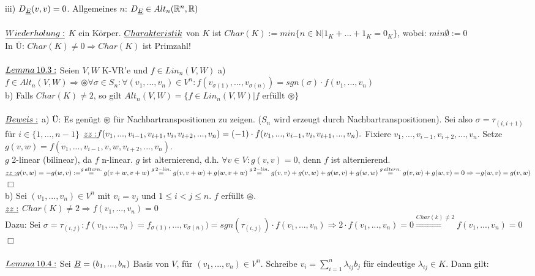\documentclass[fleqn, a4paper, 11pt]{article}
\begin{document}
iii) $D_{\uline{E}}(v,v)=0$. Allgemeines $n$: $D_{\uline{E}}\in Alt_n(\mathbb{R}^n,\mathbb{R})$\\
\\
$\uline{Wiederholung:}$ $K$ ein K\"orper. $\uline{Charakteristik}$ von $K$ ist $Char(K):=min\{n\in\mathbb{N} | 1_K+...+1_K=0_K\}$, wobei: $min\emptyset:=0$\\
In \"U: $Char(K)\neq 0\Rightarrow Char(K)$ ist Primzahl!\\
\\
$\uline{Lemma\:10.3:}$ Seien $V,W$ K-VR'e und $f\in Lin_n(V,W)$ a) $f\in Alt_n(V,W)\Rightarrow \circledast \forall\sigma\in S_n:\forall(v_1,...,v_n)\in V^n:f(v_{\sigma(1)},...,v_{\sigma(n)})=sgn(\sigma)\cdot f(v_1,...,v_n)$\\
b) Falls $Char(K)\neq 2$, so gilt $Alt_n(V,W)=\{f\in Lin_n(V,W) | f\text{ erf\"ullt }\circledast\}$\\
\\
$\uline{Beweis:}$ a) \"U: Es gen\"ugt $\circledast$ f\"ur Nachbartranspositionen zu zeigen. ($S_n$ wird erzeugt durch Nachbartranspositionen). Sei also $\sigma=\tau_{(i,i+1)}$ f\"ur $i\in\{1,...,n-1\}$ $\uline{zz:}f(v_1,...,v_{i-1},v_{i+1},v_i,v_{i+2},...,v_n)=(-1)\cdot f(v_1,...,v_{i-1},v_i,v_{i+1},...,v_n).$ Fixiere $v_1,...,v_{i-1},v_{i+2},...,v_n$. Setze $g(v,w)=f(v_1,...,v_{i-1},v,w,v_{i+2},...,v_n)$.\\
$g$ 2-linear (bilinear), da $f$ n-linear. $g$ ist alternierend, d.h. $\forall v\in V:g(v,v)=0$, denn $f$ ist alternierend.\\
$\uline{zz:}g(v,w)=-g(w,v):=\stackrel{g\:altern.}{=}g(v+w,v+w)\stackrel{g\:2-lin.}{=}g(v,v+w)+g(w,v+w)\stackrel{g\:2-lin.}{=}g(v,v)+g(v,w)+g(w,v)+g(w,w)\stackrel{g\:altern.}{=}g(v,w)+g(w,v)=0\Rightarrow -g(w,v)=g(v,w)$ \hfill $\Box$\\
b) Sei $(v_1,...,v_n)\in V^n$ mit $v_i=v_j$ und $1\leq i<j\leq n$. $f$ erf\"ullt $\circledast$.\\
$\uline{zz:}$ $Char(K)\neq 2\Rightarrow f(v_1,...,v_n)=0$\\
Dazu: Sei $\sigma=\tau_{(i,j)}:f(v_1,...,v_n)=f_{\sigma(1)},...,v_{\sigma(n)})=sgn(\tau_{(i,j)})\cdot f(v_1,...,v_n)\Rightarrow 2\cdot f(v_1,...,v_n)=0\stackrel{Char(k)\neq 2}{\Rightarrow}f(v_1,...,v_n)=0$ \hfill $\Box$\\
\\
$\uline{Lemma\:10.4:}$ Sei $\uline{B}=(b_1,...,b_n)$ Basis von $V$, f\"ur $(v_1,...,v_n)\in V^n$. Schreibe $v_i=\sum\limits_{i=1}^n \lambda_{ij} b_j$ f\"ur eindeutige $\lambda_{ij} \in K$. Dann gilt:\\
\end{document}
